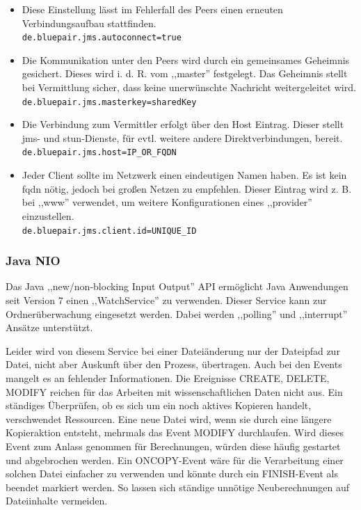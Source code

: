 \documentclass[oneside, ngerman, toc=bibliography,bibliography=totoc,listof=entryprefix, open=right,numbers=noenddot,fontsize=12pt]{scrbook}
\begin{document}
\begin{itemize}
    \item
    Diese Einstellung lässt im Fehlerfall des Peers einen erneuten Verbindungsaufbau stattfinden.\\
    \verb|de.bluepair.jms.autoconnect=true|
    
    \item Die Kommunikation unter den Peers wird durch ein gemeinsames Geheimnis gesichert. Dieses wird i. d. R. vom ,,master'' festgelegt. Das Geheimnis stellt bei  Vermittlung sicher, dass keine unerwünschte Nachricht weitergeleitet wird.\\  
    \verb|de.bluepair.jms.masterkey=sharedKey|
    
    \item Die Verbindung zum Vermittler erfolgt über den Host Eintrag.
    Dieser stellt \acrshort{jms}- und \acrshort{stun}-Dienste, für evtl. weitere andere Direktverbindungen, bereit.\\
    \verb|de.bluepair.jms.host=IP_OR_FQDN|
    \item Jeder Client sollte im Netzwerk einen eindeutigen Namen haben. Es ist kein \acrshort{fqdn} nötig, jedoch bei großen Netzen zu empfehlen. Dieser Eintrag wird z. B. bei ,,www'' verwendet, um weitere Konfigurationen eines ,,provider'' einzustellen.\\
  \verb|de.bluepair.jms.client.id=UNIQUE_ID|
\end{itemize}


\subsubsection{Java NIO}
Das Java ,,new/non-blocking Input Output'' API ermöglicht Java Anwendungen seit Version 7 einen ,,WatchService'' zu verwenden. Dieser Service kann zur Ordnerüberwachung eingesetzt werden. Dabei werden ,,polling'' und ,,interrupt'' Ansätze unterstützt.

Leider wird von diesem Service bei einer Dateiänderung nur der Dateipfad zur Datei, nicht aber Auskunft über den Prozess, übertragen. Auch bei den Events mangelt es an fehlender Informationen. Die Ereignisse CREATE, DELETE, MODIFY reichen für das Arbeiten mit wissenschaftlichen Daten nicht aus. Ein ständiges Überprüfen, ob es sich um ein noch aktives Kopieren handelt, verschwendet Ressourcen. Eine neue Datei wird, wenn sie durch eine längere Kopieraktion entsteht, mehrmals das Event MODIFY durchlaufen. Wird dieses Event zum Anlass genommen für Berechnungen, würden diese häufig gestartet und abgebrochen werden.  Ein ONCOPY-Event wäre für die Verarbeitung einer solchen Datei einfacher zu verwenden und könnte durch ein FINISH-Event als beendet markiert werden. So lassen sich ständige unnötige Neuberechnungen auf Dateiinhalte vermeiden.
\end{document}
